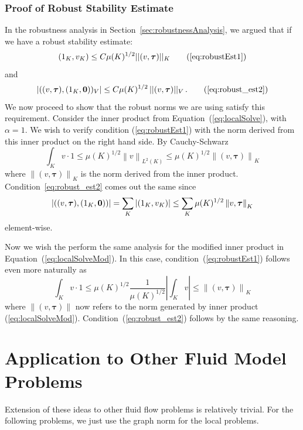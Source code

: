 \documentclass[letterpaper]{article}
\def\btau{\boldsymbol\tau}
\def\bftau{\boldsymbol\tau}
\newcommand{\norm}[1]{\left\| #1 \right\|}
\newcommand{\LRl}[1]{\left| #1 \right|}
\begin{document}
\subsubsection{Proof of Robust Stability Estimate}
In the robustness analysis in Section~\ref{sec:robustnessAnalysis}, we argued
that if we have a robust stability estimate:
\begin{equation}
(1_K, v_K) \leq C \mu(K)^{1/2} || (v,\bftau) ||_K
\tag{\ref{eq:robustEst1}}
\end{equation}
and
\begin{equation}
| ((v,\bftau),(1_K,{\bf 0}))_V | \leq C \mu(K)^{1/2} \, || (v,\bftau) ||_V\,.
\tag{\ref{eq:robust_est2}}
\end{equation}
We now proceed to show that the robust norms we are using satisfy this
requirement.
Consider the inner product from Equation~(\ref{eq:localSolve}), with
$\alpha=1$. We wish to
verify condition (\ref{eq:robustEst1}) with the norm derived from this inner
product on the right hand side. By Cauchy-Schwarz
\begin{equation}
   \int_K v\cdot
   1\leq\mu(K)^{1/2}\norm{v}_{L^2(K)}\leq\mu(K)^{1/2}\norm{(v,\btau)}_K
   \label{eq:robustProof}
\end{equation}
where $\norm{(v,\btau)}_K$ is the norm derived from the inner product.
Condition~\ref{eq:robust_est2} comes out the same since
$$|(
(v,\btau),(1_K,{\bf0}))| =
\sum_K|(1_K,v_K)|\leq\sum_K\mu(K)^{1/2}\norm{v,\btau}_K
$$
element-wise.

Now we wish the perform the same analysis for the modified inner product in
Equation~(\ref{eq:localSolveMod}). In this case,
condition~(\ref{eq:robustEst1}) follows even more naturally as
\begin{equation}
   \int_K v\cdot1\leq\mu(K)^{1/2}\frac{1}{\mu(K)^{1/2}}\LRl{\int_Kv}
   \leq\norm{(v,\btau)}_K
   \label{eq:robustProof2}
\end{equation}
where $\norm{(v,\btau)}$ now refers to the norm generated by inner product
(\ref{eq:localSolveMod}). Condition~(\ref{eq:robust_est2}) follows by the same
reasoning.

\section{Application to Other Fluid Model Problems}
Extension of these ideas to other fluid flow problems is relatively trivial.
For the following problems, we just use the graph norm for the local problems.
\end{document}
